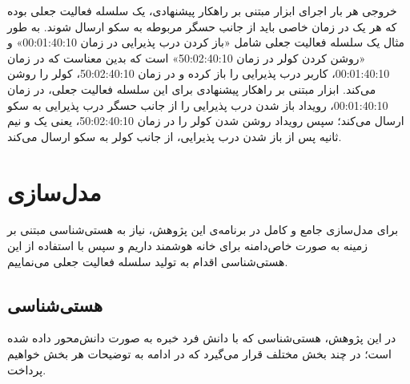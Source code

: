 خروجی هر بار اجرای ابزار مبتنی بر راهکار پیشنهادی، یک سلسله فعالیت جعلی بوده که هر یک در زمان خاصی باید از جانب حسگر مربوطه به سکو ارسال شوند. به طور مثال یک سلسله فعالیت جعلی شامل «باز کردن درب پذیرایی در زمان 00:01:40:10» و «روشن کردن کولر در زمان 50:02:40:10» است که بدین معناست که در زمان 00:01:40:10، کاربر درب پذیرایی را باز کرده و در زمان 50:02:40:10، کولر را روشن می‌کند. ابزار مبتنی بر راهکار پیشنهادی برای این سلسله فعالیت جعلی، در زمان 00:01:40:10، رویداد باز شدن درب پذیرایی را از جانب حسگر درب پذیرایی به سکو ارسال می‌کند؛ سپس رویداد روشن شدن کولر را در زمان 50:02:40:10، یعنی یک و نیم ثانیه پس از باز شدن درب پذیرایی، از جانب کولر به سکو ارسال می‌کند.

\section{مدل‌سازی}\label{chapter:c44}

برای مدل‌سازی جامع و کامل در برنامه‌ی این پژوهش، نیاز به هستی‌شناسی مبتنی بر زمینه به صورت خاص‌دامنه برای خانه هوشمند داریم و سپس با استفاده از این هستی‌شناسی اقدام به تولید سلسله فعالیت جعلی می‌نماییم.

\subsection{هستی‌شناسی}

در این پژوهش، هستی‌شناسی که با دانش فرد خبره به صورت دانش‌محور داده شده است؛ در چند بخش مختلف قرار می‌گیرد که در ادامه به توضیحات هر بخش خواهیم پرداخت.

